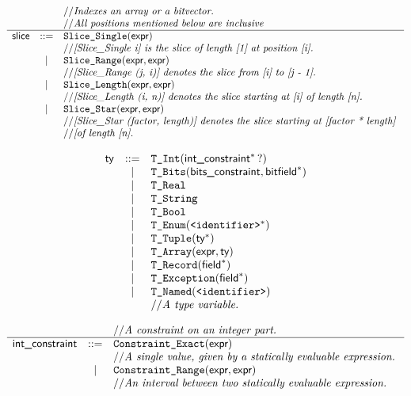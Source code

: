 \documentclass{book}
\begin{document}
\[
\begin{array}{rcl}
&&// \textit{Indexes an array or a bitvector.}\ \\
&&// \textit{All positions mentioned below are inclusive}\ \\
\hline
\textsf{slice} &::=& \texttt{Slice\_Single} (\textsf{expr}) \\
  & & // \textit{[Slice\_Single i] is the slice of length [1] at position [i].}\ \\
  &|& \texttt{Slice\_Range}(\textsf{expr}, \textsf{expr}) \\
  & & // \textit{[Slice\_Range (j, i)] denotes the slice from [i] to [j - 1].}\ \\
  &|& \texttt{Slice\_Length}(\textsf{expr}, \textsf{expr}) \\
  & & // \textit{[Slice\_Length (i, n)] denotes the slice starting at [i] of length
          [n].}\ \\
  &|& \texttt{Slice\_Star}(\textsf{expr}, \textsf{expr}) \\
  & & // \textit{[Slice\_Star (factor, length)] denotes the slice starting at [factor
          * length]}\ \\
  & & // \textit{[of length [n].}\ \\
\end{array}
\]

\[
\begin{array}{rcl}
\textsf{ty} &::=& \texttt{T\_Int}(\textsf{int\_constraint}^*\,?) \\
  &|& \texttt{T\_Bits}(\textsf{bits\_constraint}, \textsf{bitfield}^{*}) \\
  &|& \texttt{T\_Real} \\
  &|& \texttt{T\_String} \\
  &|& \texttt{T\_Bool} \\
  &|& \texttt{T\_Enum}(\texttt{<identifier>}^{*}) \\
  &|& \texttt{T\_Tuple}(\textsf{ty}^{*}) \\
  &|& \texttt{T\_Array}(\textsf{expr}, \textsf{ty}) \\
  &|& \texttt{T\_Record}(\textsf{field}^{*}) \\
  &|& \texttt{T\_Exception}(\textsf{field}^{*}) \\
  &|& \texttt{T\_Named}(\texttt{<identifier>})\\
  & & // \textit{A type variable.}\ \\
\end{array}
\]

\[
\begin{array}{rcl}
& & // \textit{A constraint on an integer part.}\ \\
\hline
\textsf{int\_constraint} &::=& \texttt{Constraint\_Exact}(\textsf{expr}) \\
  & & // \textit{A single value, given by a statically evaluable expression.}\ \\
  &|& \texttt{Constraint\_Range}(\textsf{expr}, \textsf{expr}) \\
  & & // \textit{An interval between two statically evaluable expression.}\ \\
\end{array}
\]
\end{document}
